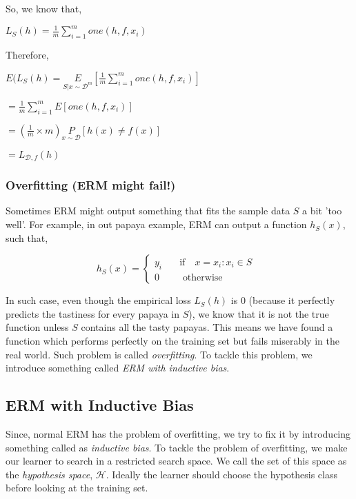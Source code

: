 \documentclass[a4paper]{article}
\begin{document}
            So, we know that,
            \begin{center}
                $L_S(h) = \frac{1}{m}\displaystyle\sum_{i=1}^{m}one(h,f,x_i)$
            \end{center}
            Therefore,
            
            \begin{center}
                $E(L_S(h) = \underset{S|x\sim\mathcal{D}^m}{E}[\frac{1}{m}\displaystyle\sum_{i=1}^{m}one(h,f,x_i)]$
                
                \hspace{12px} $=\frac{1}{m}\displaystyle\sum_{i=1}^{m}E[one(h,f,x_i)]$
                
                \hspace{35px}$=(\frac{1}{m} \times m) \underset{x \sim \mathcal{D}}{P}[h(x) \neq f(x)]$
                
                \hspace{-45px} $=L_{\mathcal{D},f}(h)$
            \end{center}
        
    \subsubsection{Overfitting (ERM might fail!)}
        Sometimes ERM might output something that fits the sample data $S$ a bit 'too well'. For example, in out papaya example, ERM can output a function $h_S(x)$, such that,
        \begin{center}
            \[ h_S(x) =
                  \begin{cases}
                    y_i   & \quad \text{if }\text{ $x = x_i : x_i \in S$ }\\
                    0  & \quad \text{ otherwise}
                  \end{cases}
                \]
        \end{center}
        
        In such case, even though the empirical loss $L_S(h)$ is $0$ (because it perfectly predicts the tastiness for every papaya in $S$), we know that it is not the true function unless $S$ contains all the tasty papayas. This means we have found a function which performs perfectly on the training set but fails miserably in the real world. Such problem is called \textit{overfitting}. To tackle this problem, we introduce something called \textit{ERM with inductive bias}.
    
    \subsection{ERM with Inductive Bias}
        Since, normal ERM has the problem of overfitting, we try to fix it by introducing something called as \textit{inductive bias}. To tackle the problem of overfitting, we make our learner to search in a restricted search space. We call the set of this space as the \textit{hypothesis space}, $\mathcal{H}$. Ideally the learner should choose the hypothesis class before looking at the training set.
        
\end{document}
